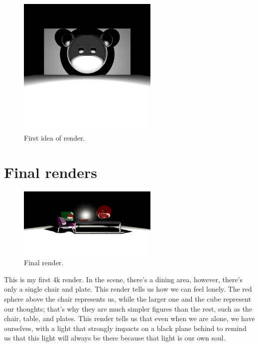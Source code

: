 \documentclass[12pt]{article}
\begin{document}
	\begin{figure}[h]
		\centering
		\includegraphics[width=0.6\textwidth]{image20.png}
		\caption{First idea of render.}
		\label{fig:image5}
	\end{figure}
	
	\clearpage
	
	\section{Final renders}
	
	\begin{figure}[h]
		\centering
		\includegraphics[width=0.6\textwidth]{FINAL1.png}
		\caption{Final render.}
		\label{fig:image6}
	\end{figure}
	
	This is my first 4k render. In the scene, there's a dining area, however, there's only a single chair and plate. This render tells us how we can feel lonely. The red sphere above the chair represents us, while the larger one and the cube represent our thoughts; that's why they are much simpler figures than the rest, such as the chair, table, and plates. This render tells us that even when we are alone, we have ourselves, with a light that strongly impacts on a black plane behind to remind us that this light will always be there because that light is our own soul.\\
	
\end{document}
